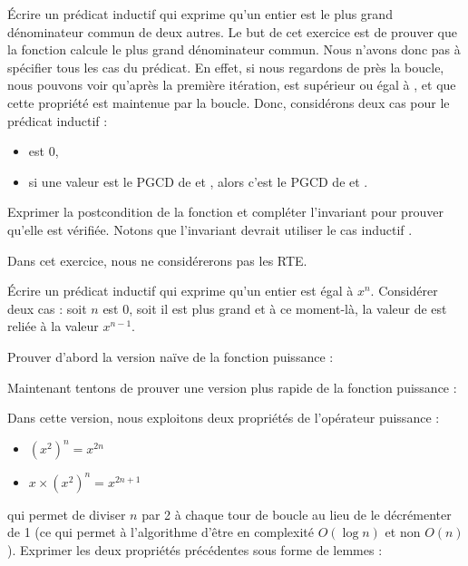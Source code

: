 

Écrire un prédicat inductif qui exprime qu'un entier est le plus grand dénominateur
commun de deux autres. Le but de cet exercice est de prouver que la fonction
 calcule le plus grand dénominateur commun. Nous n'avons donc pas
à spécifier tous les cas du prédicat. En effet, si nous regardons de près la boucle,
nous pouvons voir qu'après la première itération,  est supérieur ou
égal à , et que cette propriété est maintenue par la boucle. Donc,
considérons deux cas pour le prédicat inductif :
\begin{itemize}
\item {} est 0,
\item si une valeur  est le PGCD de  et ,
      alors c'est le PGCD de  et .
\end{itemize}




Exprimer la postcondition de la fonction et compléter l'invariant pour prouver
qu'elle est vérifiée. Notons que l'invariant devrait utiliser le cas inductif
.






Dans cet exercice, nous ne considérerons pas les RTE.


Écrire un prédicat inductif qui exprime qu'un entier  est égal
à $x^n$. Considérer deux cas : soit $n$ est 0, soit il est plus grand et à ce
moment-là, la valeur de  est reliée à la valeur $x^{n-1}$.




Prouver d'abord la version naïve de la fonction puissance :




Maintenant tentons de prouver une version plus rapide de la fonction puissance :




Dans cette version, nous exploitons deux propriétés de l'opérateur puissance :
\begin{itemize}
\item $(x^2)^n = x^{2n}$
\item $x \times (x^2)^n = x^{2n+1}$
\end{itemize}
qui permet de diviser $n$ par 2 à chaque tour de boucle au lieu de le décrémenter
de 1 (ce qui permet à l'algorithme d'être en complexité $O(\log n)$ et non $O(n)$).
Exprimer les deux propriétés précédentes sous forme de lemmes :


